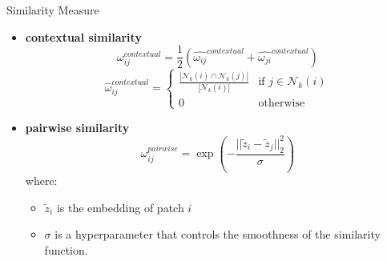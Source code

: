 \documentclass{beamer}
\begin{document}
\begin{frame}{Similarity Measure}
      \begin{itemize}
              \item \textbf{contextual similarity} \begin{equation}
                  \omega_{ij}^{contextual} = \frac{1}{2}(\hat{\omega_{ij}}^{contextual} + \hat{\omega_{ji}}^{contextual})
              \end{equation}
              \begin{equation}
                  \hat{\omega}_{ij}^{contextual} = \begin{cases}
                      \frac{|\mathcal{N}_k(i) \cap \mathcal{N}_k(j)|}{|\mathcal{N}_k(i)|} & \text{if } j \in \mathcal{N}_k(i)\\
                      0 & \text{otherwise}
                  \end{cases}
                  \end{equation}
              \item \textbf{pairwise similarity} \begin{equation}
                  \omega_{ij}^{pairwise} = \exp(-\frac{||\tilde{z}_i - \tilde{z}_j||^2_2}{\sigma})
                  \end{equation}
                  where:
                  \begin{itemize}
                      \item $\tilde{z}_i$ is the embedding of patch $i$ 
                      \item $\sigma$ is a hyperparameter that controls the smoothness of the similarity function.
              \end{itemize}
              \end{itemize}
  \end{frame}
\end{document}
